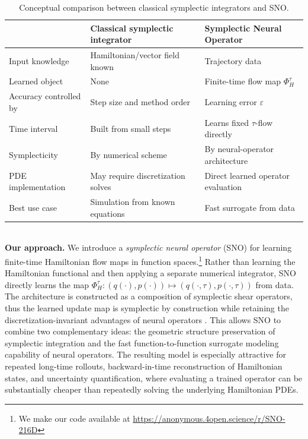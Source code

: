 \documentclass{article}
\theoremstyle{plain}
\theoremstyle{definition}
\theoremstyle{remark}
\begin{document}
\begin{table}[t]
\centering
\caption{Conceptual comparison between classical symplectic integrators and SNO.}
\begin{tabular}{lll}
\toprule
 & Classical symplectic integrator & Symplectic Neural Operator \\
\midrule
Input knowledge & \small{Hamiltonian/vector field known} & Trajectory data \\
Learned object & None & Finite-time flow map \(\Phi_H^\tau\) \\
\small{Accuracy controlled by} & Step size and method order & Learning error \(\varepsilon\) \\
Time interval & Built from small steps & Learns fixed \(\tau\)-flow directly \\
Symplecticity & By numerical scheme & By neural-operator architecture \\
\small{PDE implementation} & \small{May require discretization}  solves & \small{Direct learned operator evaluation} \\
Best use case & \small{Simulation from known equations} & Fast surrogate from data \\
\bottomrule
\end{tabular}
\end{table}\\
\textbf{Our approach.}
We introduce a \emph{symplectic neural operator} (SNO) for learning finite-time Hamiltonian flow maps in function spaces.\footnote{We make our code available at \url{https://anonymous.4open.science/r/SNO-216D}}
Rather than learning the Hamiltonian functional and then applying a separate numerical integrator, SNO directly learns the map
\(
    \Phi_H^\tau : (q(\cdot),p(\cdot)) \mapsto (q(\cdot,\tau),p(\cdot,\tau))
\)
from data.
The architecture is constructed as a composition of symplectic shear operators, thus the learned update map is symplectic by construction while retaining the discretization-invariant advantages of neural operators \cite{kovachki2023neuraloperator}.
This allows SNO to combine two complementary ideas: the geometric structure preservation of symplectic integration and the fast function-to-function surrogate modeling capability of neural operators.
The resulting model is especially attractive for repeated long-time rollouts,
backward-in-time reconstruction of Hamiltonian states, and uncertainty quantification,
where evaluating a trained operator can be substantially cheaper than repeatedly
solving the underlying Hamiltonian PDEs.\\
\end{document}
